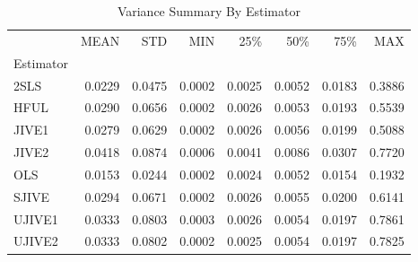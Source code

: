\begin{table}[ht]
\centering
\caption{Variance Summary By Estimator}
\begin{tabular}{lrrrrrrr}
\toprule
 & MEAN & STD & MIN & 25\% & 50\% & 75\% & MAX \\
Estimator &  &  &  &  &  &  &  \\
\midrule
2SLS & 0.0229 & 0.0475 & 0.0002 & 0.0025 & 0.0052 & 0.0183 & 0.3886 \\
HFUL & 0.0290 & 0.0656 & 0.0002 & 0.0026 & 0.0053 & 0.0193 & 0.5539 \\
JIVE1 & 0.0279 & 0.0629 & 0.0002 & 0.0026 & 0.0056 & 0.0199 & 0.5088 \\
JIVE2 & 0.0418 & 0.0874 & 0.0006 & 0.0041 & 0.0086 & 0.0307 & 0.7720 \\
OLS & 0.0153 & 0.0244 & 0.0002 & 0.0024 & 0.0052 & 0.0154 & 0.1932 \\
SJIVE & 0.0294 & 0.0671 & 0.0002 & 0.0026 & 0.0055 & 0.0200 & 0.6141 \\
UJIVE1 & 0.0333 & 0.0803 & 0.0003 & 0.0026 & 0.0054 & 0.0197 & 0.7861 \\
UJIVE2 & 0.0333 & 0.0802 & 0.0002 & 0.0025 & 0.0054 & 0.0197 & 0.7825 \\
\bottomrule
\end{tabular}
\end{table}
